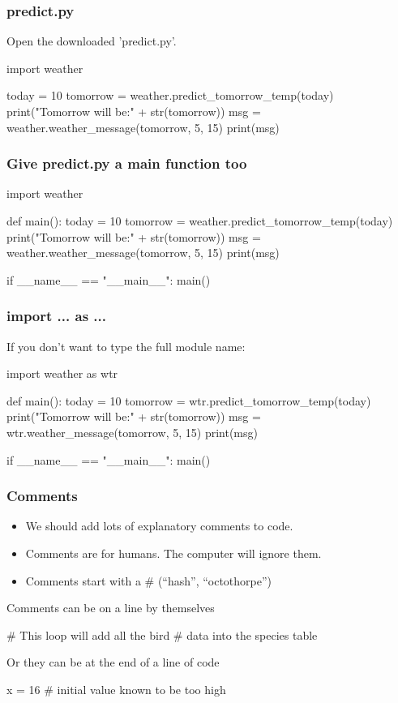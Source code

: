 \documentclass{beamer}
\begin{document}
\begin{frame}[fragile]
\frametitle{predict.py}
Open the downloaded 'predict.py'.

\bigskip

\begin{code} 
import weather

today = 10
tomorrow = weather.predict_tomorrow_temp(today)
print("Tomorrow will be:" + str(tomorrow))
msg = weather.weather_message(tomorrow, 5, 15)
print(msg)
\end{code}
\end{frame}

\begin{frame}[fragile]
\frametitle{Give predict.py a main function too}
\begin{code}
import weather

def main():
   today = 10
   tomorrow = weather.predict_tomorrow_temp(today)
   print("Tomorrow will be:" + str(tomorrow))
   msg = weather.weather_message(tomorrow, 5, 15)
   print(msg)

if __name__ == "__main__":
   main()
\end{code}
\end{frame}

\begin{frame}[fragile]
\frametitle{import  ... as ...}

If you don't want to type the full module name:
 
\begin{code}
import weather as wtr

def main():
   today = 10
   tomorrow = wtr.predict_tomorrow_temp(today)
   print("Tomorrow will be:" + str(tomorrow))
   msg = wtr.weather_message(tomorrow, 5, 15)
   print(msg)

if __name__ == "__main__":
   main()
\end{code}
\end{frame}

\begin{frame}[fragile]
\frametitle{Comments}
\begin{itemize}
\item We should add lots of explanatory comments to code.
\item Comments are for humans. The computer will ignore them.
\item Comments start with a \# (``hash'', ``octothorpe'')
\end{itemize}

\bigskip

 Comments can be on a line by themselves
\begin{code}
# This loop will add all the bird
# data into the species table
\end{code}

\bigskip

Or they can be at the end of a line of code
\begin{code}
x = 16 # initial value known to be too high
\end{code}
\end{frame}
\end{document}
